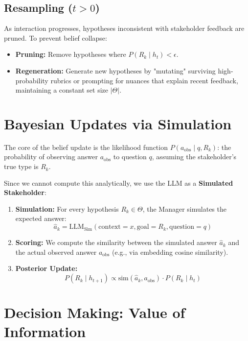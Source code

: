 \documentclass[letterpaper]{article}
\newcommand{\ThetaSet}{\Theta}
\newcommand{\Rubric}{R}
\newcommand{\Question}{q}
\newcommand{\AnswerObs}{a_{\text{obs}}}
\newcommand{\AnswerSim}{\hat{a}}
\newcommand{\History}{h}
\begin{document}
\subsection{Resampling ($t > 0$)}
As interaction progresses, hypotheses inconsistent with stakeholder feedback are pruned. To prevent belief collapse:
\begin{itemize}
    \item \textbf{Pruning:} Remove hypotheses where $P(\Rubric_k \mid \History_t) < \epsilon$.
    \item \textbf{Regeneration:} Generate new hypotheses by "mutating" surviving high-probability rubrics or prompting for nuances that explain recent feedback, maintaining a constant set size $|\ThetaSet|$.
\end{itemize}

\section{Bayesian Updates via Simulation}

The core of the belief update is the likelihood function $P(\AnswerObs \mid \Question, \Rubric_k)$: the probability of observing answer $\AnswerObs$ to question $\Question$, assuming the stakeholder's true type is $\Rubric_k$.

Since we cannot compute this analytically, we use the LLM as a \textbf{Simulated Stakeholder}:

\begin{enumerate}
    \item \textbf{Simulation:} For every hypothesis $\Rubric_k \in \ThetaSet$, the Manager simulates the expected answer:
    \begin{equation}
        \AnswerSim_k = \text{LLM}_{\text{Sim}}(\text{context}=x, \text{goal}=\Rubric_k, \text{question}=\Question)
    \end{equation}
    \item \textbf{Scoring:} We compute the similarity between the simulated answer $\AnswerSim_k$ and the actual observed answer $\AnswerObs$ (e.g., via embedding cosine similarity).
    \item \textbf{Posterior Update:}
    \begin{equation}
        P(\Rubric_k \mid \History_{t+1}) \propto \text{sim}(\AnswerSim_k, \AnswerObs) \cdot P(\Rubric_k \mid \History_t)
    \end{equation}
\end{enumerate}

\section{Decision Making: Value of Information}
\end{document}
